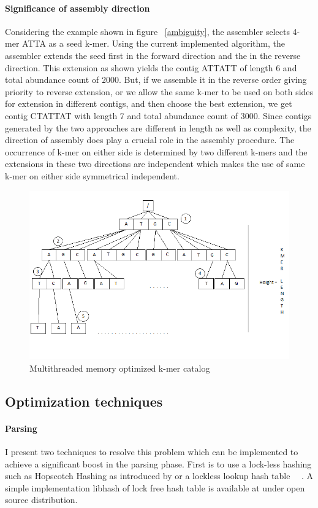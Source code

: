 \label{key}\documentclass[bachinf, english ,zihtitle,final,hyperref,utf8]{zihpub}
\begin{document}
\paragraph{Significance of assembly direction}
Considering the example shown in figure ~\ref{ambiguity}, the assembler selects 4-mer ATTA as a seed k-mer. Using the current implemented algorithm, the assembler extends the seed first in the forward direction and the in the reverse direction. This extension as shown yields the contig ATTATT of length 6 and total abundance count of 2000. But, if we assemble it in the reverse order giving priority to reverse extension, or we allow the same k-mer to be used on both sides for extension in different contigs, and then choose the best extension, we get contig CTATTAT with length 7 and total abundance count of 3000. Since contigs generated by the two approaches are different in length as well as complexity, the direction of assembly does play a crucial role in the assembly procedure. The occurrence of k-mer on either side is determined by two different k-mers and the extensions in these two directions are independent which makes the use of same k-mer on either side symmetrical independent.
\begin{figure}[h]
\center
\includegraphics[scale=0.7]{multi-thread}
\caption{Multithreaded memory optimized k-mer catalog}
\label{trie}
\end{figure}
\subsection{Optimization techniques}
\paragraph{Parsing}
I present two techniques to resolve this problem which can be implemented to achieve a significant boost in the parsing phase. First is to use a lock-less hashing such as Hopscotch Hashing as introduced by \cite{hopscotch} or a lockless lookup hash table ~~\cite{tock}. A simple implementation libhash of lock free hash table is available at \cite{lockfree} under open source distribution.
\end{document}

